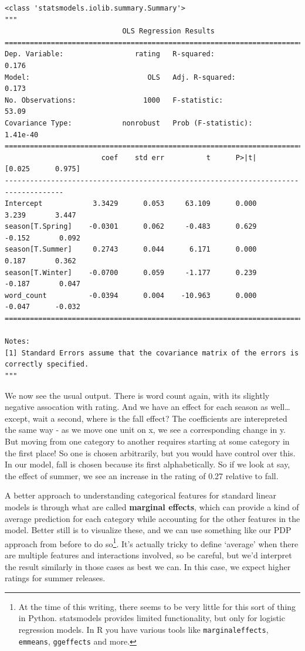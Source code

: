 \documentclass[
  letterpaper,
]{krantz}
\begin{document}
\begin{verbatim}
<class 'statsmodels.iolib.summary.Summary'>
"""
                            OLS Regression Results                            
==============================================================================
Dep. Variable:                 rating   R-squared:                       0.176
Model:                            OLS   Adj. R-squared:                  0.173
No. Observations:                1000   F-statistic:                     53.09
Covariance Type:            nonrobust   Prob (F-statistic):           1.41e-40
====================================================================================
                       coef    std err          t      P>|t|      [0.025      0.975]
------------------------------------------------------------------------------------
Intercept            3.3429      0.053     63.109      0.000       3.239       3.447
season[T.Spring]    -0.0301      0.062     -0.483      0.629      -0.152       0.092
season[T.Summer]     0.2743      0.044      6.171      0.000       0.187       0.362
season[T.Winter]    -0.0700      0.059     -1.177      0.239      -0.187       0.047
word_count          -0.0394      0.004    -10.963      0.000      -0.047      -0.032
====================================================================================

Notes:
[1] Standard Errors assume that the covariance matrix of the errors is correctly specified.
"""
\end{verbatim}

We now see the usual output. There is word count again, with its
slightly negative assocation with rating. And we have an effect for each
season as well\ldots{} except, wait a second, where is the fall effect?
The coefficients are interepreted the same way - as we move one unit on
x, we see a corresponding change in y. But moving from one category to
another requires starting at some category in the first place! So one is
chosen arbitrarily, but you would have control over this. In our model,
fall is chosen because its first alphabetically. So if we look at say,
the effect of summer, we see an increase in the rating of 0.27 relative
to fall.

A better approach to understanding categorical features for standard
linear models is through what are called \textbf{marginal effects},
which can provide a kind of average prediction for each category while
accounting for the other features in the model. Better still is to
visualize these, and we can use something like our PDP approach from
before to do so\footnote{At the time of this writing, there seems to be
  very little for this sort of thing in Python. statsmodels provides
  limited functionality, but only for logistic regression models. In R
  you have various tools like \texttt{marginaleffects},
  \texttt{emmeans}, \texttt{ggeffects} and more.}. It's actually tricky
to define `average' when there are multiple features and interactions
involved, so be careful, but we'd interpret the result similarly in
those cases as best we can. In this case, we expect higher ratings for
summer releases.
\end{document}
